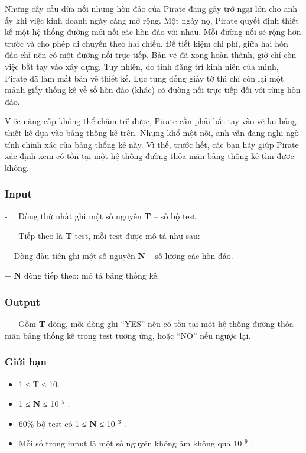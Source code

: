 

Những cây cầu dừa nối những hòn đảo của Pirate đang gây trở ngại lớn cho anh ấy khi việc kinh doanh ngày càng mở rộng. Một ngày nọ, Pirate quyết định thiết kế một hệ thống đường mới nối các hòn đảo với nhau. Mỗi đường nối sẽ rộng hơn trước và cho phép di chuyển theo hai chiều. Để tiết kiệm chi phí, giữa hai hòn đảo chỉ nên có một đường nối trực tiếp. Bản vẽ đã xong hoàn thành, giờ chỉ còn việc bắt tay vào xây dựng. Tuy nhiên, do tính đãng trí kinh niên của mình, Pirate đã làm mất bản vẽ thiết kế. Lục tung đống giấy tờ thì chỉ còn lại một mảnh giấy thống kê về số hòn đảo (khác) có đường nối trực tiếp đối với từng hòn đảo.

Việc nâng cấp không thể chậm trễ được, Pirate cần phải bắt tay vào vẽ lại bảng thiết kế dựa vào bảng thống kê trên. Nhưng khổ một nỗi, anh vẫn đang nghi ngờ tính chính xác của bảng thống kê này. Vì thế, trước hết, các bạn hãy giúp Pirate xác định xem có tồn tại một hệ thống đường thỏa mãn bảng thống kê tìm được không.

\subsubsection{Input}

-   Dòng thứ nhất ghi một số nguyên \textbf{ T } – số bộ test.

-   Tiếp theo là \textbf{ T } test, mỗi test được mô tả như sau:

+ Dòng đàu tiên ghi một số nguyên \textbf{ N } – số lượng các hòn đảo.

+ \textbf{ N } dòng tiếp theo: mô tả bảng thống kê.

\subsubsection{Output}

-   Gồm \textbf{ T } dòng, mỗi dòng ghi “YES” nếu có tồn tại một hệ thống đường thỏa mãn bảng thống kê trong test tương ứng, hoặc “NO” nếu ngược lại.

\subsubsection{Giới hạn}
\begin{itemize}
	\item 1 ≤ T ≤ 10.
	\item 1 ≤ \textbf{ N } ≤ 10 $^ 5 $ .
	\item 60\% bộ test có 1 ≤ \textbf{ N } ≤ 10 $^ 3 $ .
	\item Mỗi số trong input là một số nguyên không âm không quá 10 $^ 9 $ .
\end{itemize}

